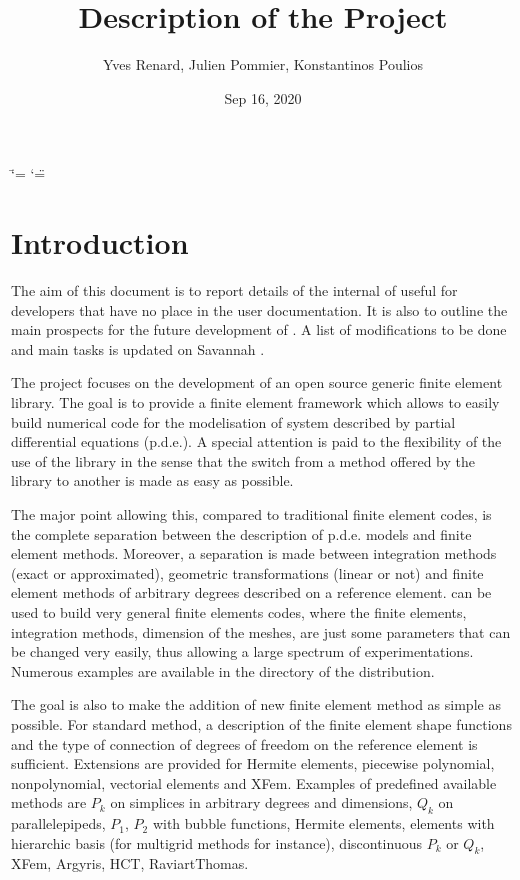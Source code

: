 \documentclass[a4paper,11pt,english]{sphinxmanual}
\title{Description of the Project}
\date{Sep 16, 2020}
\author{Yves Renard, Julien Pommier, Konstantinos Poulios}
\begin{document}
\ifdefined\shorthandoff
  \ifnum\catcode`\=\string=\active\shorthandoff{=}\fi
  \ifnum\catcode`\"=\active{}\fi
\fi

\pagestyle{empty}
\sphinxmaketitle
\pagestyle{plain}
\sphinxtableofcontents
\pagestyle{normal}
\label{\detokenize{project/index::doc}}



\chapter{Introduction}
\label{\detokenize{project/intro:introduction}}\label{\detokenize{project/intro:dp-intro}}\label{\detokenize{project/intro::doc}}
The aim of this document is to report details of the internal of 
useful for developers that have no place in the user documentation.
It is also to outline the main prospects for the future development
of . A list of modifications to be done and main tasks is updated
on Savannah .

The  project focuses on the development of an open source generic
finite element library.
The goal is to provide a finite element framework which allows to
easily build numerical code for the modelisation of system described
by partial differential equations (p.d.e.). A special attention is paid
to the flexibility of the use of the library in the sense that the
switch from a method offered by the library to another is made as easy
as possible.

The major point allowing this, compared to traditional finite element
codes, is the complete separation between the description of p.d.e.
models and finite element methods. Moreover, a separation is made
between integration methods (exact or approximated), geometric
transformations (linear or not) and finite element methods of
arbitrary degrees described on a reference element.  can
be used to build very general finite elements codes, where the
finite elements, integration methods, dimension of the meshes,
are just some parameters that can
be changed very easily, thus allowing a large spectrum of experimentations.
Numerous examples are available in the  directory of the
distribution.

The goal is also to make the addition of new finite element method
as simple as possible. For standard method, a description of the
finite element shape functions and the type of connection of degrees
of freedom on the reference element is sufficient. Extensions are
provided for Hermite elements, piecewise polynomial, non\sphinxhyphen{}polynomial,
vectorial elements and XFem. Examples of predefined
available methods are \(P_k\) on simplices in arbitrary degrees and
dimensions, \(Q_k\) on parallelepipeds, \(P_1\), \(P_2\)
with bubble functions, Hermite elements, elements with hierarchic
basis (for multigrid methods for instance),
discontinuous \(P_k\) or \(Q_k\), XFem, Argyris, HCT, Raviart\sphinxhyphen{}Thomas.
\end{document}
